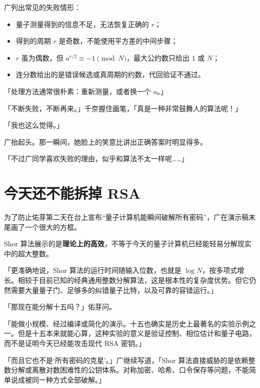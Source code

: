 广列出常见的失败情形：

\begin{itemize}[leftmargin=2em]
  \item 量子测量得到的信息不足，无法恢复正确的 $r$；
  \item 得到的周期 $r$ 是奇数，不能使用平方差的中间步骤；
  \item $r$ 虽为偶数，但 $a^{r/2}\equiv-1\pmod N$，最大公约数只给出 $1$ 或 $N$；
  \item 连分数给出的是错误候选或真周期的约数，代回验证不通过。
\end{itemize}

「处理方法通常很朴素：重新测量，或者换一个 $a$。」

「不断失败，不断再来。」千奈握住画笔，「真是一种非常鼓舞人的算法呢！」

「我也这么觉得。」

广抬起头。那一瞬间，她脸上的笑意比讲出正确答案时明显得多。

「不过广同学喜欢失败的理由，似乎和算法不太一样呢……」

\section{今天还不能拆掉 RSA}

为了防止佑芽第二天在台上宣布“量子计算机能瞬间破解所有密码”，广在演示稿末尾画了一个很大的方框。

\begin{center}
\setlength{\fboxsep}{8pt}%
\colorbox{codebg}{%
\parbox{0.88\linewidth}{%
Shor 算法展示的是\textbf{理论上的高效}，不等于今天的量子计算机已经能轻易分解现实中的超大整数。}}
\end{center}

「更准确地说，Shor 算法的运行时间随输入位数，也就是 $\log N$，按多项式增长。相较于目前已知的经典通用整数分解算法，这是根本性的复杂度优势。但它仍然需要大量量子门、足够多的纠错量子比特，以及可靠的容错运行。」\cite{ch07shor,ch07ibmtutorial}

「那现在能分解十五吗？」佑芽问。

「能做小规模、经过编译或简化的演示。十五也确实是历史上最著名的实验示例之一。但是十五本来就能心算，这种实验的意义是验证控制、相位估计和量子电路，而不是证明今天已经能攻击现代 RSA 密钥。」\cite{ch07ibmtutorial}

「而且它也不是‘所有密码的克星’。」广继续写道，「Shor 算法直接威胁的是依赖整数分解或离散对数困难性的公钥体系。对称加密、哈希、口令保存等问题，不能简单说成被同一种方式全部破解。」

